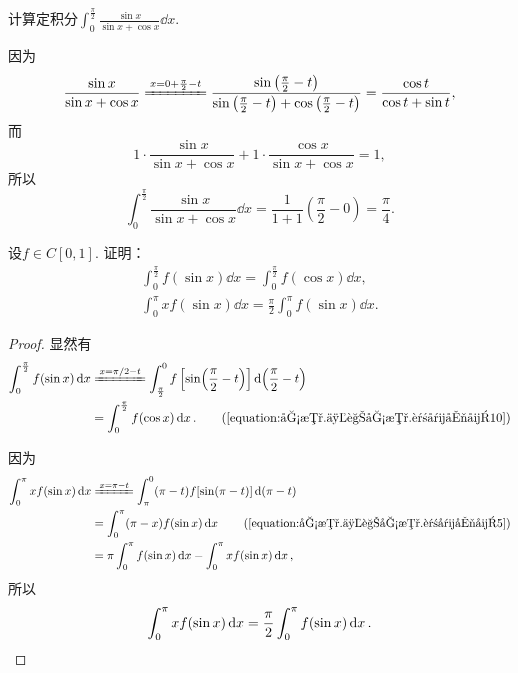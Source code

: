 \begin{example}
计算定积分\(\int_0^{\frac{\pi}{2}} \frac{\sin x}{\sin x + \cos x} \dd{x}\).
\begin{solution}
因为\[
	\frac{\sin x}{\sin x + \cos x}
	\xlongequal{x=0+\frac\pi2-t}
	\frac{\sin\left(\frac{\pi}{2}-t\right)}
		{\sin\left(\frac{\pi}{2}-t\right) + \cos\left(\frac{\pi}{2}-t\right)}
	= \frac{\cos t}{\cos t + \sin t},
\]
而\[
	1 \cdot \frac{\sin x}{\sin x + \cos x}
	+ 1 \cdot \frac{\cos x}{\sin x + \cos x}
	= 1,
\]
所以\[
	\int_0^{\frac{\pi}{2}} \frac{\sin x}{\sin x + \cos x} \dd{x}
	= \frac{1}{1+1}\left(\frac\pi2-0\right)
	= \frac\pi4.
\]
\end{solution}
\end{example}

\begin{proposition}\label{theorem:定积分.正余弦函数的复合的积分1}
设\(f \in C[0,1]\).
证明：\begin{gather}
	\int_0^{\frac\pi2} f(\sin x) \dd{x}
	= \int_0^{\frac\pi2} f(\cos x) \dd{x}, \\
	\int_0^\pi x f(\sin x) \dd{x}
	= \frac{\pi}{2} \int_0^\pi f(\sin x) \dd{x}.
\end{gather}
\begin{proof}
显然有\begin{align*}
	\int_0^{\frac\pi2} f(\sin x) \dd{x}
	&\xlongequal{x = \pi/2-t}
		\int_{\frac\pi2}^0 f\left[\sin(\frac{\pi}{2}-t)\right] \dd(\frac{\pi}{2}-t) \\
	&= \int_0^{\frac\pi2} f(\cos x) \dd{x}.
		\tag{\cref{equation:函数.三角函数.诱导公式10}}
\end{align*}

因为\begin{align*}
	\int_0^\pi x f(\sin x) \dd{x}
	&\xlongequal{x = \pi-t}
		\int_{\pi}^0 (\pi-t) f[\sin(\pi-t)] \dd(\pi-t) \\
	&= \int_0^\pi (\pi-x) f(\sin x) \dd{x}
		\tag{\cref{equation:函数.三角函数.诱导公式5}} \\
	&= \pi \int_0^\pi f(\sin x) \dd{x}
		- \int_0^\pi x f(\sin x) \dd{x},
\end{align*}
所以\[
	\int_0^\pi x f(\sin x) \dd{x}
	= \frac{\pi}{2} \int_0^\pi f(\sin x) \dd{x}.
	\qedhere
\]
\end{proof}
\end{proposition}

